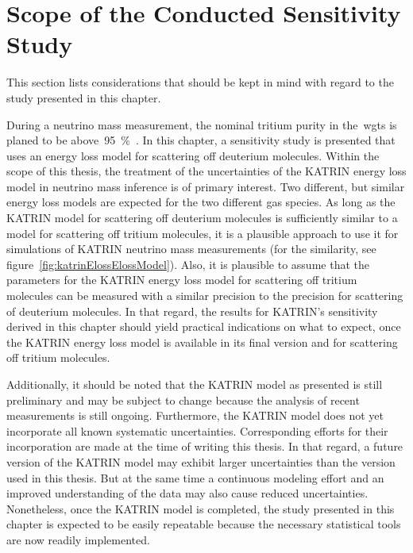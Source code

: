 \section{Scope of the Conducted Sensitivity Study}
\label{sec:katrinElossValidity}
This section lists considerations that should be kept in mind with regard to the study presented in this chapter.

During a neutrino mass measurement, the nominal tritium purity in the~\gls{wgts} is planed to be above~\SI{95}{\percent}~\cite{Angrik:2005ep}. In this chapter, a sensitivity study is presented that uses an energy loss model for scattering off deuterium molecules. Within the scope of this thesis, the treatment of the uncertainties of the KATRIN energy loss model in neutrino mass inference is of primary interest. Two different, but similar energy loss models are expected for the two different gas species. As long as the KATRIN model for scattering off deuterium molecules is sufficiently similar to a model for scattering off tritium molecules, it is a plausible approach to use it for simulations of KATRIN neutrino mass measurements (for the similarity, see figure~\ref{fig:katrinElossElossModel}). Also, it is plausible to assume that the parameters for the KATRIN energy loss model for scattering off tritium molecules can be measured with a similar precision to the precision for scattering of deuterium molecules. In that regard, the results for KATRIN's sensitivity derived in this chapter should yield practical indications on what to expect, once the KATRIN energy loss model is available in its final version and for scattering off tritium molecules.

Additionally, it should be noted that the KATRIN model as presented is still preliminary and may be subject to change because the analysis of recent measurements is still ongoing. Furthermore, the KATRIN model does not yet incorporate all known systematic uncertainties. Corresponding efforts for their incorporation are made at the time of writing this thesis. In that regard, a future version of the KATRIN model may exhibit larger uncertainties than the version used in this thesis. But at the same time a continuous modeling effort and an improved understanding of the data may also cause reduced uncertainties. Nonetheless, once the KATRIN model is completed, the study presented in this chapter is expected to be easily repeatable because the necessary statistical tools are now readily implemented.
\FloatBarrier



